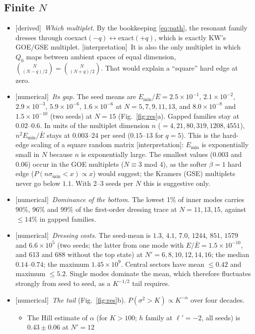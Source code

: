\documentclass[11pt]{article}
\newcommand{\Np}{N'}
\newcommand{\lp}{\ell'}
\newcommand{\tagbox}[2]{\textsf{\small\color{#1}[#2]}}
\newcommand{\DER}{\tagbox{cder}{derived}}
\newcommand{\NUM}{\tagbox{cnum}{numerical}}
\newcommand{\INTERP}{\tagbox{cconj}{interpretation}}
\theoremstyle{plain}
\theoremstyle{remark}
\numberwithin{equation}{section}
\begin{document}
\subsection{Finite \texorpdfstring{$N$}{N}}
\begin{itemize}\itemsep1pt
\item \DER\ \emph{Which multiplet.} By the bookkeeping \eqref{eq:path}, the resonant family dresses through
coexact$(-q)\leftrightarrow$exact$(+q)$, which is exactly KW's GOE/GSE multiplet.
\INTERP\ It is also the only multiplet in which $Q_0$ maps between ambient spaces of equal dimension,
$\binom{N}{(N-q)/2}=\binom N{(N+q)/2}$. That would explain a ``square'' hard edge at zero.
\item \NUM\ \emph{Its gap.} The seed means are $E_{\min}/\bar E=2.5\times10^{-1}$, $2.1\times10^{-2}$, $2.9\times10^{-3}$,
$5.9\times10^{-6}$, $1.6\times10^{-6}$ at $N=5,7,9,11,13$, and $8.0\times10^{-8}$ and $1.5\times10^{-10}$ (two seeds) at $N=15$ (Fig.~\ref{fig:res}a). Gapped
families stay at $0.02$--$0.6$. In units of the multiplet dimension $n$ ($=4,21,80,319,1208,4551$),
$n^2E_{\min}/\bar E$ stays at $0.003$--$24$ per seed ($0.15$--$13$ for $q=5$). This is the hard-edge scaling of a square
random matrix \INTERP: $E_{\min}$ is exponentially small in $N$ because $n$ is exponentially large. The smallest values
($0.003$ and $0.06$) occur in the GOE multiplets ($N\equiv3$ mod 4), as the softer $\beta=1$ hard edge
($P(n\sigma_{\min}<x)\propto x$) would suggest; the Kramers (GSE) multiplets never go below $1.1$. With 2--3 seeds per $N$
this is suggestive only.
\item \NUM\ \emph{Dominance of the bottom.} The lowest 1\% of inner modes carries 90\%, 96\% and 99\% of the
first-order dressing trace at $N=11,13,15$, against $\le14\%$ in gapped families.
\item \NUM\ \emph{Dressing costs.} The seed-mean is $1.3$, $4.1$, $7.0$, $1244$, $851$, $1579$ and $6.6\times10^5$ (two seeds; the latter from one mode with $E/\bar E=1.5\times10^{-10}$, and 613 and 688 without the top state) at
$\Np=6,8,10,12,14,16$; the median $0.14$--$0.74$; the maximum $1.45\times10^{9}$. Central sectors have mean $\le0.42$ and
maximum $\le5.2$. Single modes dominate the mean, which therefore fluctuates strongly from seed to seed, as a
$K^{-1/2}$ tail requires.
\item \NUM\ \emph{The tail} (Fig.~\ref{fig:res}b). $P(\sigma^2>K)\propto K^{-\alpha}$ over four decades.
\begin{itemize}\itemsep0pt
\item The Hill estimate of $\alpha$ (for $K>100$; $h$ family at $\lp=-2$, all seeds) is $0.43\pm0.06$ at $\Np=12$

\end{itemize}
\end{itemize}
\end{document}
